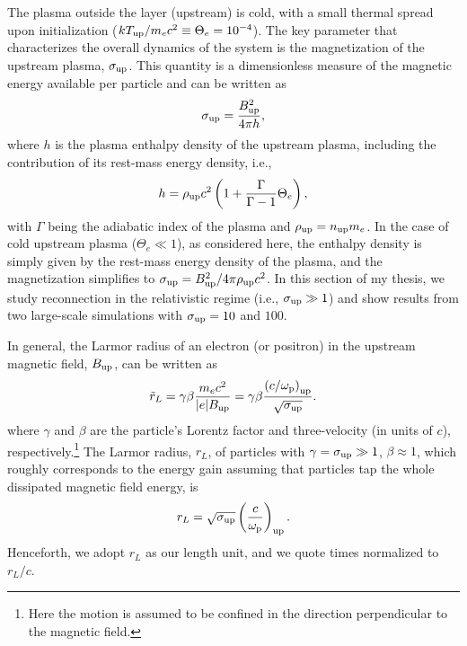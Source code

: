 The plasma outside the layer (upstream) is cold, with a small thermal spread upon initialization ($k T_{\rm up}/m_e c^2 \equiv \Theta_e =10^{-4}$). The key parameter that characterizes the overall dynamics of the system is the magnetization of the upstream plasma, $\sigma_{\rm up}$. This quantity is a dimensionless measure of the magnetic energy available per particle and can be written as
\begin{equation}
    \label{eq:rec-sigmaups}
    \sigma_{\rm up} = \frac{B_{\rm up}^2}{4\pi h},
\end{equation}
where $h$ is the plasma enthalpy density of the upstream plasma, including the contribution of its rest-mass energy density, i.e., 
\begin{equation}
    \label{eq:rec-enthalpy}
    h = \rho_{\rm up}c^2\left(1 + \frac{\Gamma}{\Gamma-1} \Theta_e\right),
\end{equation} 
with $\Gamma$ being the adiabatic index of the plasma and $\rho_{\rm up}=n_{\rm up} m_e$. In the case of cold upstream plasma ($\Theta_e \ll 1$), as considered here, the enthalpy density is simply given by the rest-mass energy  density of the plasma, and the magnetization simplifies to $\sigma_{\rm up} = B_{\rm up}^2/4\pi \rho_{\rm up} c^2$. In this section of my thesis, we study reconnection in the relativistic regime (i.e., $\sigma_{\rm up}\gg 1$) and show results from two large-scale simulations with $\sigma_{\rm up}=10$ and $100$.

In general, the Larmor radius of an electron (or positron) in the upstream magnetic field, $B_{\rm up}$, can be written as 
\begin{equation}
    \tilde{r}_{L} = \gamma\beta \frac{m_e c^2}{|e| B_{\rm up}} = 
    \gamma\beta\frac{\left(c/\omega_{\rm p}\right)_{\rm up}}{\sqrt{\sigma_{\rm up}}}.
\end{equation}
where $\gamma$ and $\beta$ are the particle's Lorentz factor and three-velocity (in units of $c$), respectively.\footnote{Here the motion is assumed to be confined in the direction perpendicular to the magnetic field.} The Larmor radius, $r_L$, of particles with $\gamma=\sigma_{\rm up}\gg 1$, $\beta\approx 1$, which roughly corresponds to the energy gain assuming that particles tap the whole dissipated magnetic field energy, is
 \begin{equation}
 \label{eq:rec-rL}
    r_{L}=\sqrt{\sigma_{\rm up}}\left(\frac{c}{\omega_{\rm p}}\right)_{\rm up}.
\end{equation}
Henceforth, we adopt $r_{L}$ as our length unit, and we quote times normalized to $r_L/c$. 

